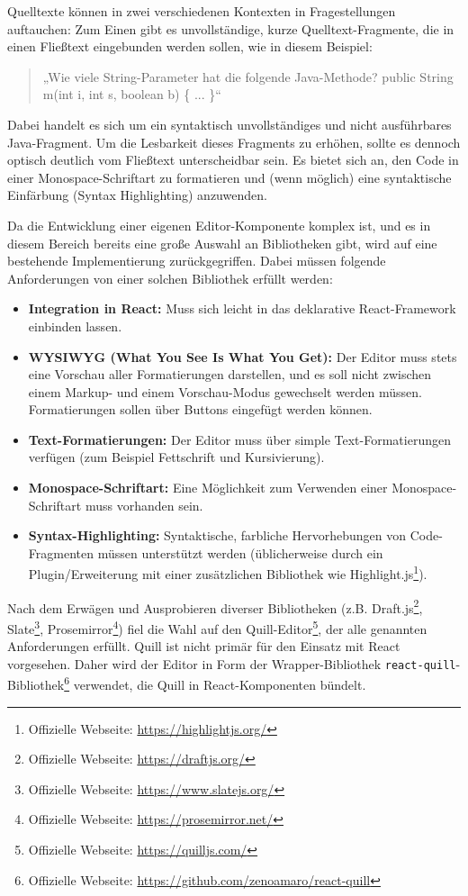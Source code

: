 Quelltexte können in zwei verschiedenen Kontexten in Fragestellungen auftauchen: Zum Einen gibt es unvollständige, kurze Quelltext-Fragmente, die in einen Fließtext eingebunden werden sollen, wie in diesem Beispiel:

\begin{quote}
„Wie viele String-Parameter hat die folgende Java-Methode?\newline
public String m(int i, int s, boolean b) \{ ... \}“
\end{quote}

Dabei handelt es sich um ein syntaktisch unvollständiges und nicht ausführbares Java-Fragment. Um die Lesbarkeit dieses Fragments zu erhöhen, sollte es dennoch optisch deutlich vom Fließtext unterscheidbar sein. Es bietet sich an, den Code in einer Monospace-Schriftart zu formatieren und (wenn möglich) eine syntaktische Einfärbung (Syntax Highlighting) anzuwenden.

Da die Entwicklung einer eigenen Editor-Komponente komplex ist, und es in diesem Bereich bereits eine große Auswahl an Bibliotheken gibt, wird auf eine bestehende Implementierung zurückgegriffen. Dabei müssen folgende Anforderungen von einer solchen Bibliothek erfüllt werden:

\begin{itemize}
    \item \textbf{Integration in React:}  Muss sich leicht in das deklarative React-Framework einbinden lassen.
    \item \textbf{WYSIWYG (What You See Is What You Get):} Der Editor muss stets eine Vorschau aller Formatierungen darstellen, und es soll nicht zwischen einem Markup- und einem Vorschau-Modus gewechselt werden müssen. Formatierungen sollen über Buttons eingefügt werden können.
    \item \textbf{Text-Formatierungen:} Der Editor muss über simple Text-Formatierungen verfügen (zum Beispiel Fettschrift und Kursivierung).
    \item \textbf{Monospace-Schriftart:} Eine Möglichkeit zum Verwenden einer Monospace-Schriftart muss vorhanden sein.
    \item \textbf{Syntax-Highlighting:} Syntaktische, farbliche Hervorhebungen von Code-Fragmenten müssen unterstützt werden (üblicherweise durch ein Plugin/Erweiterung mit einer zusätzlichen Bibliothek wie Highlight.js\footnote{Offizielle Webseite: \url{https://highlightjs.org/}}).
\end{itemize}

Nach dem Erwägen und Ausprobieren diverser Bibliotheken (z.B. Draft.js\footnote{Offizielle Webseite: \url{https://draftjs.org/}}, Slate\footnote{Offizielle Webseite: \url{https://www.slatejs.org/}}, Prosemirror\footnote{Offizielle Webseite: \url{https://prosemirror.net/}}) fiel die Wahl auf den Quill-Editor\footnote{Offizielle Webseite: \url{https://quilljs.com/}}, der alle genannten Anforderungen erfüllt. Quill ist nicht primär für den Einsatz mit React vorgesehen. Daher wird der Editor in Form der Wrapper-Bibliothek \texttt{react-quill}-Bibliothek\footnote{Offizielle Webseite: \url{https://github.com/zenoamaro/react-quill}} verwendet, die Quill in React-Komponenten bündelt.

